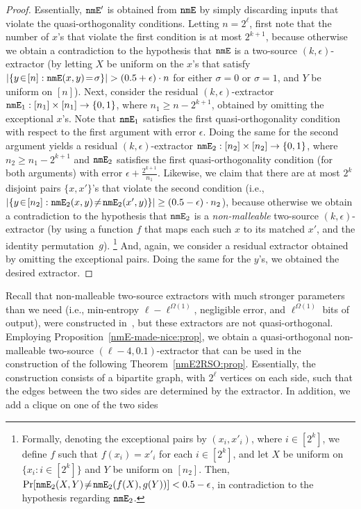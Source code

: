 \documentclass[10pt,a4paper]{article}
\theoremstyle{definition}
\newcommand{\prob}{{\rm Pr}}
\newcommand{\e}{\epsilon}
\newcommand{\bitset}{\{0,1\}}
\newcommand{\BPF}{\begin{proof}} \newcommand{\EPF}{\end{proof}}
\newcommand{\nmE}{{\tt nmE}}
\begin{document}
\BPF
Essentially, $\nmE'$ is obtained from $\nmE$ by simply discarding inputs
that violate the quasi-orthogonality conditions.
%
Letting $n=2^\ell$, first note that the number of $x$'s that violate
the first condition is at most $2^{k+1}$,
because otherwise we obtain a contradiction
to the hypothesis that $\nmE$ is a two-source $(k,\e)$-extractor
(by letting $X$ be uniform on the $x$'s that satisfy
$|\{y\!\in\![n]:\nmE(x,y)\!=\!\sigma\}|>(0.5+\e)\cdot n$
for either $\sigma=0$ or $\sigma=1$, and $Y$ be uniform on $[n]$).
Next, consider the
residual $(k,\e)$-extractor $\nmE_1:[n_1]\times[n_1]\to\bitset$,
where $n_1\geq n-2^{k+1}$, obtained by omitting the exceptional $x$'s.
Note that $\nmE_1$ satisfies the first quasi-orthogonality condition
with respect to the first argument with error $\e$.
Doing the same for the second argument yields
a residual $(k,\e)$-extractor $\nmE_2:[n_2]\times[n_2]\to\bitset$,
where $n_2\geq n_1-2^{k+1}$ and $\nmE_2$ satisfies
the first quasi-orthogonality condition (for both arguments)
with error $\e+\frac{2^{k+1}}{n_1}$.
Likewise, we claim that there are at most $2^{k}$
disjoint pairs $\{x,x'\}$'s that violate the second condition (i.e.,
$|\{y\!\in\![n_2]:\nmE_2(x,y)\!\neq\!\nmE_2(x',y)\}|\geq(0.5-\e)\cdot n_2$),
because otherwise we obtain a contradiction to the hypothesis
that $\nmE_2$ is a {\em non-malleable}\/ two-source $(k,\e)$-extractor
(by using a function $f$ that maps each such $x$ to its matched $x'$,
and the identity permutation~$g$).
\footnote{Formally, denoting the exceptional pairs by $(x_i,x'_i)$,
where $i\in[2^k]$, we define $f$ such that $f(x_i)=x'_i$ for each $i\in[2^k]$,
and let $X$ be uniform on $\{x_i:i\!\in\![2^k]\}$
and $Y$ be uniform on $[n_2]$.
Then, $\prob[\nmE_2(X,Y)\!\neq\!\nmE_2(f(X),g(Y))]<0.5-\e$,
in contradiction to the hypothesis regarding $\nmE_2$.}
%
And, again, we consider a residual extractor obtained
by omitting the exceptional pairs.
Doing the same for the $y$'s, we obtained the desired extractor.
\EPF

\medskip
Recall that non-malleable two-source extractors with much stronger
parameters than we need (i.e., min-entropy $\ell-\ell^{\Omega(1)}$,
negligible error, and $\ell^{\Omega(1)}$ bits of output),
were constructed in~\cite[Thm.~1]{CGL},
but these extractors are not quasi-orthogonal.
Employing Proposition~\ref{nmE-made-nice:prop},
we obtain a quasi-orthogonal non-malleable
two-source $(\ell-4,0.1)$-extractor that can be used
in the construction of the following Theorem~\ref{nmE2RSO:prop}.
%
%
%
%
%
%
Essentially, the construction consists of a bipartite graph,
with $2^\ell$ vertices on each side, such that
the edges between the two sides are determined by the extractor.
In addition, we add a clique on one of the two sides
\end{document}
